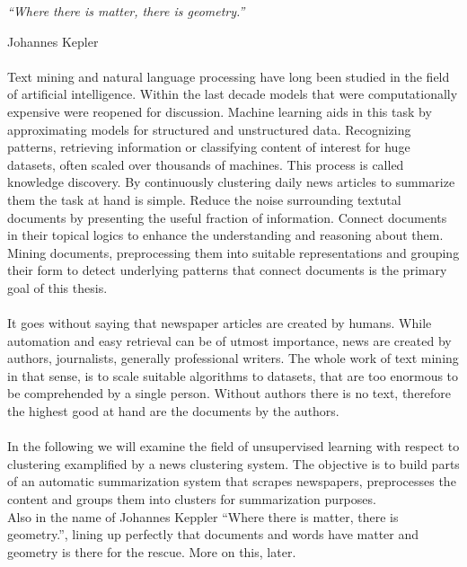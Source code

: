 \epigraph{\emph{
  ``Where there is matter, there is geometry.''
}}{ Johannes Kepler }

\paragraph{} Text mining and natural language processing have long been studied in the field of artificial intelligence. Within the last decade models that were computationally expensive were reopened for discussion. Machine learning aids in this task by approximating models for structured and unstructured data. Recognizing patterns, retrieving information or classifying content of interest for huge datasets, often scaled over thousands of machines. This process is called knowledge discovery. By continuously clustering daily news articles to summarize them the task at hand is simple. Reduce the noise surrounding textutal documents by presenting the useful fraction of information. Connect documents in their topical logics to enhance the understanding and reasoning about them. Mining documents, preprocessing them into suitable representations and grouping their form to detect underlying patterns that connect documents is the primary goal of this thesis.

\paragraph{} It goes without saying that newspaper articles are created by humans. While automation and easy retrieval can be of utmost importance, news are created by authors, journalists, generally professional writers. The whole work of text mining in that sense, is to scale suitable algorithms to datasets, that are too enormous to be comprehended by a single person. Without authors there is no text, therefore the highest good at hand are the documents by the authors.

\paragraph{} In the following we will examine the field of unsupervised learning with respect to clustering examplified by a news clustering system. The objective is to build parts of an automatic summarization system that scrapes newspapers, preprocesses the content and groups them into clusters for summarization purposes.\\
Also in the name of Johannes Keppler ``Where there is matter, there is geometry.'', lining up perfectly that documents and words have matter and geometry is there for the rescue. More on this, later.

